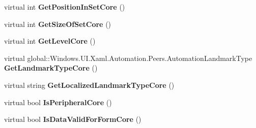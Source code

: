 \begin{DoxyCompactItemize}
\item 
\mbox{\label{class_windows_1_1_u_i_1_1_xaml_1_1_automation_1_1_peers_1_1_automation_peer_a1bcb3ef7e7391852a768d6874d898f73}} 
virtual int {\bfseries Get\+Position\+In\+Set\+Core} ()
\item 
\mbox{\label{class_windows_1_1_u_i_1_1_xaml_1_1_automation_1_1_peers_1_1_automation_peer_a4f2274f1bbafc48d35ae4a1baaf68144}} 
virtual int {\bfseries Get\+Size\+Of\+Set\+Core} ()
\item 
\mbox{\label{class_windows_1_1_u_i_1_1_xaml_1_1_automation_1_1_peers_1_1_automation_peer_aa68b2502b978bd14d3692f0943c7ebe2}} 
virtual int {\bfseries Get\+Level\+Core} ()
\item 
\mbox{\label{class_windows_1_1_u_i_1_1_xaml_1_1_automation_1_1_peers_1_1_automation_peer_a16b5c59f62d9cfb375b06085b3ebface}} 
virtual global\+::\+Windows.\+U\+I.\+Xaml.\+Automation.\+Peers.\+Automation\+Landmark\+Type {\bfseries Get\+Landmark\+Type\+Core} ()
\item 
\mbox{\label{class_windows_1_1_u_i_1_1_xaml_1_1_automation_1_1_peers_1_1_automation_peer_a81ded2ee8cb403207b5438e524931e09}} 
virtual string {\bfseries Get\+Localized\+Landmark\+Type\+Core} ()
\item 
\mbox{\label{class_windows_1_1_u_i_1_1_xaml_1_1_automation_1_1_peers_1_1_automation_peer_a5868d299d4d9698f50f5f3af851f85d2}} 
virtual bool {\bfseries Is\+Peripheral\+Core} ()
\item 
\mbox{\label{class_windows_1_1_u_i_1_1_xaml_1_1_automation_1_1_peers_1_1_automation_peer_a375e173803947dba5bb2ee40016d54e9}} 
virtual bool {\bfseries Is\+Data\+Valid\+For\+Form\+Core} ()
\item 
\mbox{\label{class_windows_1_1_u_i_1_1_xaml_1_1_automation_1_1_peers_1_1_automation_peer_a03e2b030728b5480baca09928e51811f}} 

\end{DoxyCompactItemize}
